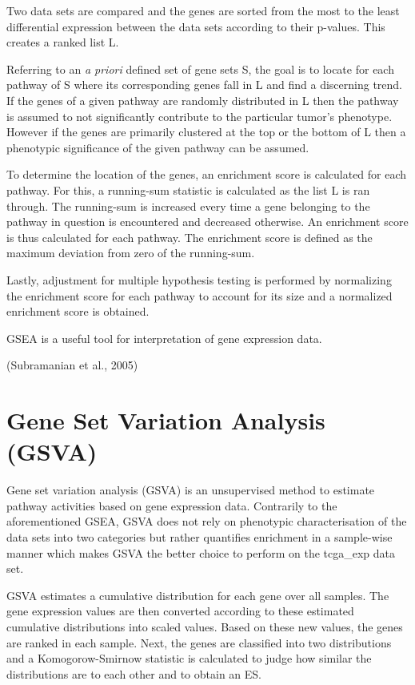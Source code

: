 \documentclass[
  parskip,
  oneside]{scrreprt}
\begin{document}
Two data sets are compared and the genes are sorted from the most to the
least differential expression between the data sets according to their
p-values. This creates a ranked list L.

Referring to an \emph{a priori} defined set of gene sets S, the goal is
to locate for each pathway of S where its corresponding genes fall in L
and find a discerning trend. If the genes of a given pathway are
randomly distributed in L then the pathway is assumed to not
significantly contribute to the particular tumor's phenotype. However if
the genes are primarily clustered at the top or the bottom of L then a
phenotypic significance of the given pathway can be assumed.

To determine the location of the genes, an enrichment score is
calculated for each pathway. For this, a running-sum statistic is
calculated as the list L is ran through. The running-sum is increased
every time a gene belonging to the pathway in question is encountered
and decreased otherwise. An enrichment score is thus calculated for each
pathway. The enrichment score is defined as the maximum deviation from
zero of the running-sum.

Lastly, adjustment for multiple hypothesis testing is performed by
normalizing the enrichment score for each pathway to account for its
size and a normalized enrichment score is obtained.

GSEA is a useful tool for interpretation of gene expression data.

(Subramanian et al., 2005)

\hypertarget{gene-set-variation-analysis-gsva}{%
\section{Gene Set Variation Analysis
(GSVA)}\label{gene-set-variation-analysis-gsva}}

Gene set variation analysis (GSVA) is an unsupervised method to estimate
pathway activities based on gene expression data. Contrarily to the
aforementioned GSEA, GSVA does not rely on phenotypic characterisation
of the data sets into two categories but rather quantifies enrichment in
a sample-wise manner which makes GSVA the better choice to perform on
the tcga\_exp data set.

GSVA estimates a cumulative distribution for each gene over all samples.
The gene expression values are then converted according to these
estimated cumulative distributions into scaled values. Based on these
new values, the genes are ranked in each sample. Next, the genes are
classified into two distributions and a Komogorow-Smirnow statistic is
calculated to judge how similar the distributions are to each other and
to obtain an ES.
\end{document}
